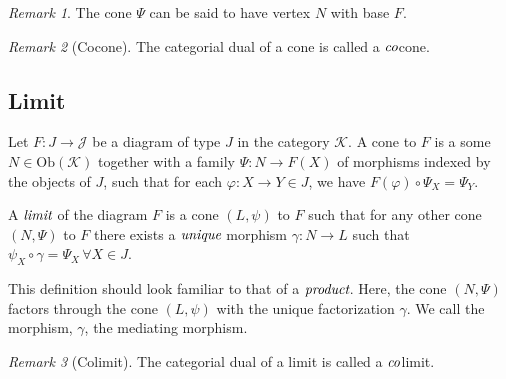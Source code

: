 \documentclass[10pt, oneside, reqno]{amsart}
\theoremstyle{plain}%
\theoremstyle{definition}
\theoremstyle{remark}
\newtheorem*{rem}{Remark}
\begin{document}
\begin{rem}
 The cone $\Psi$ can be said to have vertex $N$ with base $F$.
\end{rem}

\begin{rem}[Cocone]
 The categorial dual of a cone is called a $\emph{co}$cone.
\end{rem}

\subsection{Limit} %
\label{subsec:limit}
Let $F: J \to \mathcal{J}$ be a diagram of type $J$ in the category $\mathcal{K}$.
A cone to $F$ is a some $N \in \text{Ob}(\mathcal{K})$ together with a family
$\Psi: N \to F(X)$ of morphisms indexed by the objects of $J$, such that
for each $\varphi: X \to Y \in J$, we have $F(\varphi) \circ \Psi_{X} = \Psi_{Y}$.

A $\emph{limit}$ of the diagram $F$ is a cone $(L,\psi)$ to $F$ such that for any other
cone $(N,\Psi)$ to $F$ there exists a $\emph{unique}$ morphism $\gamma: N \to L$ such that
$\psi_{X} \circ \gamma = \Psi_{X} \, \forall X \in J$.


This definition should look familiar to that of a $\emph{product}$.
Here, the cone $(N, \Psi)$ factors through the cone $(L, \psi)$ with the unique factorization $\gamma$.
We call the morphism, $\gamma$, the mediating morphism.

\begin{rem}[Colimit]
 The categorial dual of a limit is called a $\emph{co}$limit.
\end{rem}
\end{document}
